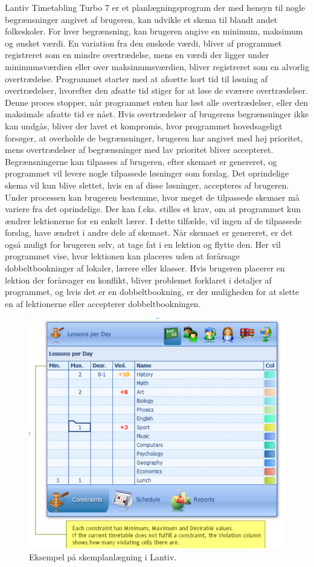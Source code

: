 Lantiv Timetabling Turbo 7 er et planlægningsprogram der med hensyn til nogle begrænsninger angivet af brugeren, kan udvikle et skema til blandt andet folkeskoler. For hver begrænsning, kan brugeren angive en minimum, maksimum og ønsket værdi. En variation fra den ønskede værdi, bliver af programmet registreret som en mindre overtrædelse, mens en værdi der ligger under minimumsværdien eller over maksimumsværdien, bliver registreret som en alvorlig overtrædelse. Programmet starter med at afsætte kort tid til løsning af overtrædelser, hvorefter den afsatte tid stiger for at løse de sværere overtrædelser. Denne proces stopper, når programmet enten har løst alle overtrædelser, eller den maksimale afsatte tid er nået. Hvis overtrædelser af brugerens begrænsninger ikke kan undgås, bliver der lavet et kompromis, hvor programmet hovedsageligt forsøger, at overholde de begrænsninger, brugeren har angivet med høj prioritet, mens overtrædelser af begrænsninger med lav prioritet bliver accepteret. Begrænsningerne kan tilpasses af brugeren, efter skemaet er genereret, og programmet vil levere nogle tilpassede løsninger som forslag. Det oprindelige skema vil kun blive slettet, hvis en af disse løsninger, accepteres af brugeren. Under processen kan brugeren bestemme, hvor meget de tilpassede skemaer må variere fra det oprindelige. Der kan f.eks. stilles et krav, om at programmet kun ændrer lektionerne for en enkelt lærer. I dette tilfælde, vil ingen af de tilpassede forslag, have ændret i andre dele af skemaet. Når skemaet er genereret, er det også muligt for brugeren selv, at tage fat i en lektion og flytte den. Her vil programmet vise, hvor lektionen kan placeres uden at forårsage dobbeltbookninger af lokaler, lærere eller klasser. Hvis brugeren placerer en lektion der forårsager en konflikt, bliver problemet forklaret i detaljer af programmet, og hvis det er en dobbeltbookning, er der muligheden for at slette en af lektionerne eller accepterer dobbeltbookningen.
\begin{figure}[!h]
  \centering
  \includegraphics[width=\textwidth]{partials/graphics/LANTIV.png}
    \caption{Eksempel på skemplanlægning i Lantiv.}
  \label{fig:lantiv}
\end{figure}

